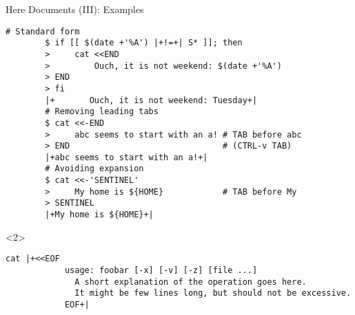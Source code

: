 \begin{frame}[fragile]{Here Documents (III): Examples}
    \vspace{-3mm}
    \begin{lstlisting}[style=MyBash]
        # Standard form
        $ if [[ $(date +'%A') |+!=+| S* ]]; then
        >     cat <<END
        >         Ouch, it is not weekend: $(date +'%A')
        > END
        > fi
        |+       Ouch, it is not weekend: Tuesday+|
        # Removing leading tabs
        $ cat <<-END
        >     abc seems to start with an a! # TAB before abc
        > END                               # (CTRL-v TAB)
        |+abc seems to start with an a!+|
        # Avoiding expansion
        $ cat <<-'SENTINEL'
        >     My home is ${HOME}            # TAB before My
        > SENTINEL
        |+My home is ${HOME}+|
    \end{lstlisting}
    \begin{uncoverenv}<2>
        \begin{lstlisting}[style=MyBash, numbers=none, aboveskip=4pt]
            cat |+<<EOF
            usage: foobar [-x] [-v] [-z] [file ...]
              A short explanation of the operation goes here.
              It might be few lines long, but should not be excessive.
            EOF+|
        \end{lstlisting}
    \end{uncoverenv}
\end{frame}
